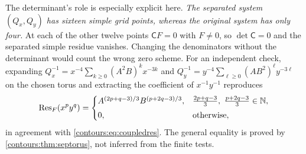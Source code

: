 \documentclass[11pt,letterpaper]{article}
\theoremstyle{definition}
\theoremstyle{remark}
\newcommand{\N}{\mathbb N}\newcommand{\Z}{\mathbb Z}\newcommand{\DD}{\mathbb D}
\numberwithin{equation}{section}
\begin{document}
\begin{example}
The determinant's role is especially explicit here. \emph{The separated system
$(Q_x,Q_y)$ has sixteen simple grid points, whereas the original system has only
four.} At each of the other twelve points $\mathsf CF=0$ with $F\ne0$, so
$\det\mathsf C=0$ and the separated simple residue vanishes. Changing the
denominators without the determinant would count the wrong zero scheme. For an
independent check, expanding
$Q_x^{-1}=x^{-4}\sum_{k\ge0}(A^2B)^kx^{-3k}$ and
$Q_y^{-1}=y^{-4}\sum_{\ell\ge0}(AB^2)^\ell y^{-3\ell}$ on the chosen torus and
extracting the coefficient of $x^{-1}y^{-1}$ reproduces
\begin{equation}\label{contours:eq:monomialres}
  \Res_F(x^py^q)=
  \begin{cases}
    A^{(2p+q-3)/3}B^{(p+2q-3)/3},
    &\tfrac{2p+q-3}{3},\ \tfrac{p+2q-3}{3}\in\N,\\[0.3em]
    0,&\text{otherwise},
  \end{cases}
\end{equation}
in agreement with \eqref{contours:eq:coupledres}. The general equality is proved by
\cref{contours:thm:septorus}, not inferred from the finite tests.
\end{example}
\end{document}
